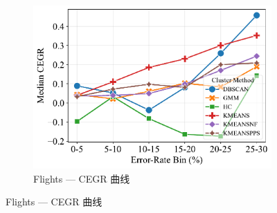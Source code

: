 \documentclass[10pt]{article} %
\numberwithin{equation}{section}
\begin{document}
\begin{enumerate}[label=(\alph*)]
\begin{figure}[H]
\begin{subfigure}[b]{0.33\linewidth}
    \includegraphics[width=\linewidth]{figures/6.4.3graph/CEGR_5pct_flights.pdf}
    \caption{Flights — CEGR 曲线}
    \label{fig:fl_cegr}
  \end{subfigure}


\end{figure}
\end{enumerate}
\end{document}
